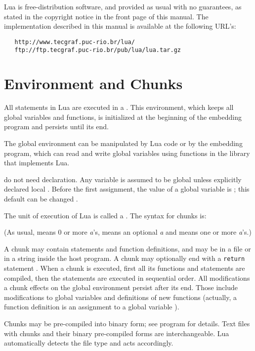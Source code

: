 Lua is free-distribution software,
and provided as usual with no guarantees,
as stated in the copyright notice in the front page of this manual.
The implementation described in this manual is available
at the following URL's:
\begin{verbatim}
   http://www.tecgraf.puc-rio.br/lua/
   ftp://ftp.tecgraf.puc-rio.br/pub/lua/lua.tar.gz
\end{verbatim}


\section{Environment and Chunks}

All statements in Lua are executed in a .
This environment, which keeps all global variables and functions,
is initialized at the beginning of the embedding program and
persists until its end.

The global environment can be manipulated by Lua code or
by the embedding program,
which can read and write global variables
using functions in the library that implements Lua.

 do not need declaration.
Any variable is assumed to be global unless explicitly declared local
.
Before the first assignment, the value of a global variable is \nil;
this default can be changed .

The unit of execution of Lua is called a .
The syntax for chunks is:
\begin{Produc}
\end{Produc}%
(As usual,  means 0 or more \emph{a}'s,
 means an optional \emph{a} and  means
one or more \emph{a}'s.)

A chunk may contain statements and function definitions,
and may be in a file or in a string inside the host program.
A chunk may optionally end with a \verb|return| statement .
When a chunk is executed, first all its functions and statements are compiled,
then the statements are executed in sequential order.
All modifications a chunk effects on the global environment persist
after its end.
Those include modifications to global variables
and definitions of new functions
(actually, a function definition is an
assignment to a global variable ).

Chunks may be pre-compiled into binary form;
see program  for details.
Text files with chunks and their binary pre-compiled forms
are interchangeable.
Lua automatically detects the file type and acts accordingly.

